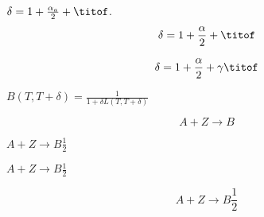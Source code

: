 \documentclass{article}
\begin{document}
  $\delta = 1 + \frac{\alpha_a}{2} + \titof $.
  $$\delta = 1 + \frac{\alpha}{2} + \titof $$

  \[
    \delta = 1 + \frac{\alpha}{2} + \gamma \titof
  \]

  $B(T, T+\delta) = \frac{1}{1 + \delta L(T, T+\delta)}$

  \[
    A + Z \rightarrow B
  \]

  \( A + Z \rightarrow B \frac{1}{2} \)

  $ A + Z \rightarrow B \frac{1}{2}$

  $$ A + Z \rightarrow B \frac{1}{2}$$
\end{document}
